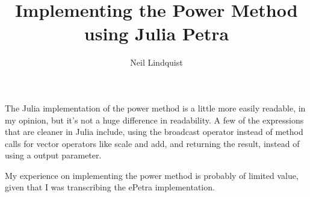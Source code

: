 \documentclass{article}
\title{Implementing the Power Method using Julia Petra}
\author{Neil Lindquist}
\begin{document}
	
The Julia implementation of the power method is a little more easily readable, in my opinion, but it's not
a huge difference in readability.
A few of the expressions that are cleaner in Julia include, using the broadcast operator instead of
method calls for vector operators like scale and add, and returning the result, instead of using a output parameter.

My experience on implementing the power method is probably of limited value, given that I was transcribing the ePetra
implementation.
\end{document}
